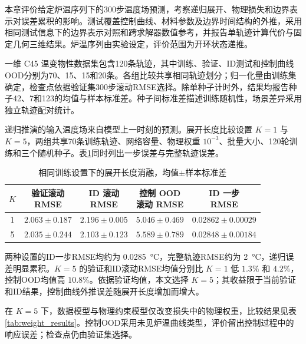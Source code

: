 
本章评价给定炉温序列下的300步温度场预测，考察递归展开、物理损失和边界表示对误差累积的影响。测试覆盖控制曲线、材料参数及边界时间结构的外推，采用相同测试信息下的边界表示对照和跨求解器数值参考，并报告单轨迹计算代价与固定几何三维结果。炉温序列由实验设定，评价范围为开环状态递推。


一维 C45 温变物性数据集包含120条轨迹，其中训练、验证、ID测试和控制曲线OOD分别为70、15、15和20条。各组比较共享相同轨迹划分；归一化量由训练集确定，检查点依据验证集300步滚动RMSE选择。除单种子计时外，结果均报告种子42、7和123的均值与样本标准差。种子间标准差描述训练随机性，场景差异采用独立轨迹配对统计。


递归推演的输入温度场来自模型上一时刻的预测。展开长度比较设置 $K=1$ 与 $K=5$，两组共享70条训练轨迹、网络容量、物理权重 $10^{-3}$、批量大小、120轮训练和三个随机种子。表\ref{tab:unroll_ablation}同时列出一步误差与完整轨迹误差。

\begin{table}[H]
  \centering
  \caption{相同训练设置下的展开长度消融，均值$\pm$样本标准差}
  \label{tab:unroll_ablation}
  \small
  \begin{tabular}{ccccc}
    \toprule
    $K$ & \shortstack{验证滚动\\RMSE} & \shortstack{ID 滚动\\RMSE} & \shortstack{控制 OOD\\滚动 RMSE} & \shortstack{ID 一步\\RMSE} \\
    \midrule
    1 & $2.063\pm0.187$ & $2.196\pm0.005$ & $\mathbf{5.046\pm0.469}$ & $0.02862\pm0.00029$ \\
    5 & $\mathbf{2.035\pm0.244}$ & $\mathbf{2.103\pm0.123}$ & $5.589\pm0.789$ & $0.02848\pm0.00184$ \\
    \bottomrule
  \end{tabular}
\end{table}

两种设置的ID一步RMSE均约为 \SI{0.0285}{\degreeCelsius}，完整轨迹RMSE约为 \SI{2}{\degreeCelsius}，递归误差明显累积。$K=5$ 的验证和ID滚动RMSE均值分别比 $K=1$ 低 $1.3\%$ 和 $4.2\%$，控制OOD均值高 $10.8\%$。依据验证均值，本文选择 $K=5$；其收益限于当前验证和ID结果，控制曲线外推误差随展开长度增加而增大。


在 $K=5$ 下，数据模型与物理约束模型仅改变损失中的物理权重，比较结果见表\ref{tab:weight_results}。控制OOD采用未见炉温曲线类型，评价留出控制过程中的响应误差；检查点仍由验证集选择。

